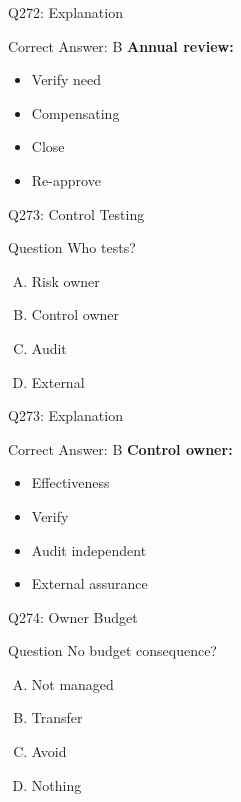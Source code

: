 \documentclass{beamer}
\begin{document}
	\begin{frame}{Q272: Explanation}
		\begin{block}{Correct Answer: B}
			\textbf{Annual review:}
			\begin{itemize}
				\item Verify need
				\item Compensating
				\item Close
				\item Re-approve
			\end{itemize}
		\end{block}
	\end{frame}
	
	\begin{frame}{Q273: Control Testing}
		\begin{block}{Question}
			Who tests?
		\end{block}
		\begin{enumerate}[(A)]
			\item Risk owner
			\item Control owner
			\item Audit
			\item External
		\end{enumerate}
	\end{frame}
	
	\begin{frame}{Q273: Explanation}
		\begin{block}{Correct Answer: B}
			\textbf{Control owner:}
			\begin{itemize}
				\item Effectiveness
				\item Verify
				\item Audit independent
				\item External assurance
			\end{itemize}
		\end{block}
	\end{frame}
	
	\begin{frame}{Q274: Owner Budget}
		\begin{block}{Question}
			No budget consequence?
		\end{block}
		\begin{enumerate}[(A)]
			\item Not managed
			\item Transfer
			\item Avoid
			\item Nothing
		\end{enumerate}
	\end{frame}
	
\end{document}

